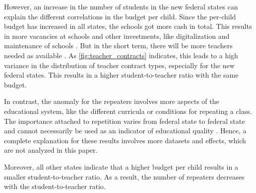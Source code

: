 However,  an increase in the number of students in the new federal states can explain the different correlations in the budget per child. Since the per-child budget has increased in all states, the schools got more cash in total. This results in more vacancies at schools \cite{kultusminister_konferenz_lehrkrafteeinstellungsbedarf_2023} and other investments, like digitalization and maintenance of schools \cite{bundesministerium_fur_bildung_und_forschung_fortschrittsbericht_2022}. But in the short term, there will be more teachers needed as available \cite{kultusminister_konferenz_lehrkrafteeinstellungsbedarf_2023}. As \autoref{fig:teacher_contracts} indicates, this leads to a high variance in the distribution of teacher contract types, especially for the new federal states. This results in a higher student-to-teacher ratio with the same budget.

In contrast, the anomaly for the repeaters involves more aspects of the educational system, like the different curricula or conditions for repeating a class. The importance attached to repetition varies from federal state to federal state and cannot necessarily be used as an indicator of educational quality \cite{klemm_klassenwiederholungen_2009}. Hence, a complete explanation for these results involves more datasets and effects, which are not analyzed in this paper.

Moreover, all other states indicate that a higher budget per child results in a smaller student-to-teacher ratio. As a result, the number of repeaters decreases with the student-to-teacher ratio.